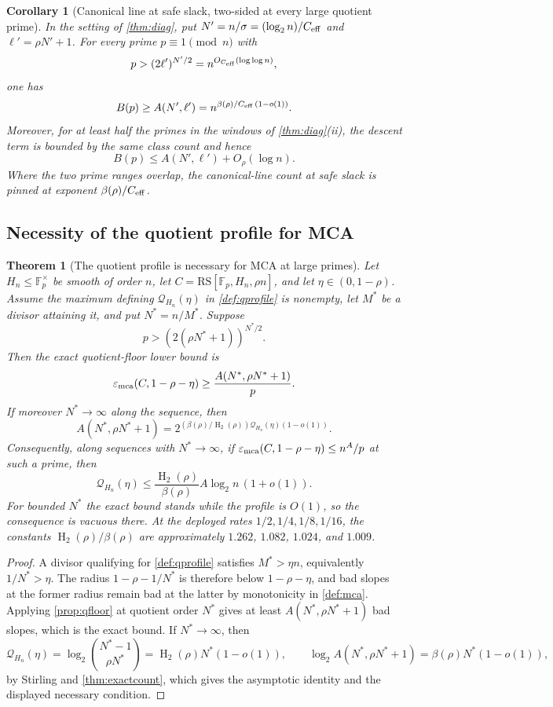 \documentclass[11pt]{article}
\newtheorem{theorem}{Theorem}[section]
\newtheorem{corollary}[corollary]{Corollary}
\theoremstyle{definition}
\newcommand{\F}{\mathbb F}
\newcommand{\eps}{\varepsilon}
\newcommand{\HH}{\operatorname{H}_2}
\newcommand{\RS}{\mathrm{RS}}
\newcommand{\emca}{\eps_{\rm mca}}
\newcommand{\ceff}{C_{\rm eff}}
\newcommand{\Acl}{A}
\begin{document}
\begin{corollary}[Canonical line at safe slack, two-sided at every large quotient prime]\label{cor:diagupgrade}
In the setting of \cref{thm:diag}, put $N'=n/\sigma=(\log_2n)/\ceff$ and $\ell'=\rho N'+1$.  For every prime $p\equiv1\pmod n$ with
\[
        p>(2\ell')^{N'/2}=n^{O_{\ceff}(\log\log n)},
\]
one has
\[
        B(p)\ge \Acl(N',\ell')=n^{\beta(\rho)/\ceff\,(1-o(1))}.
\]
Moreover, for at least half the primes in the windows of \cref{thm:diag}(ii), the descent term is bounded by the same class count and hence
\[
        B(p)\le \Acl(N',\ell')+O_\rho(\log n).
\]
Where the two prime ranges overlap, the canonical-line count at safe slack is pinned at exponent $\beta(\rho)/\ceff$.
\end{corollary}

\subsection{Necessity of the quotient profile for MCA}

\begin{theorem}[The quotient profile is necessary for MCA at large primes]\label{thm:qnecessity}
Let $H_n\le\F_p^\times$ be smooth of order $n$, let $C=\RS[\F_p,H_n,\rho n]$, and let $\eta\in(0,1-\rho)$.  Assume the maximum defining $\mathcal Q_{H_n}(\eta)$ in \cref{def:qprofile} is nonempty, let $M^*$ be a divisor attaining it, and put $N^*=n/M^*$.  Suppose
\[
        p>(2(\rho N^*+1))^{N^*/2}.
\]
Then the exact quotient-floor lower bound is
\[
        \emca(C,1-\rho-\eta)
        \ge
        \frac{\Acl(N^*,\rho N^*+1)}{p}.
\]
If moreover $N^*\to\infty$ along the sequence, then
\[
        \Acl(N^*,\rho N^*+1)
        =
        2^{(\beta(\rho)/\HH(\rho))\mathcal Q_{H_n}(\eta)(1-o(1))}.
\]
Consequently, along sequences with $N^*\to\infty$, if $\emca(C,1-\rho-\eta)\le n^A/p$ at such a prime, then
\[
        \mathcal Q_{H_n}(\eta)
        \le
        \frac{\HH(\rho)}{\beta(\rho)}A\log_2n\,(1+o(1)).
\]
For bounded $N^*$ the exact bound stands while the profile is $O(1)$, so the consequence is vacuous there.  At the deployed rates $1/2,1/4,1/8,1/16$, the constants $\HH(\rho)/\beta(\rho)$ are approximately $1.262$, $1.082$, $1.024$, and $1.009$.
\end{theorem}

\begin{proof}
A divisor qualifying for \cref{def:qprofile} satisfies $M^*>\eta n$, equivalently $1/N^*>
\eta$.  The radius $1-\rho-1/N^*$ is therefore below $1-\rho-\eta$, and bad slopes at the former radius remain bad at the latter by monotonicity in \cref{def:mca}.  Applying \cref{prop:qfloor} at quotient order $N^*$ gives at least $\Acl(N^*,\rho N^*+1)$ bad slopes, which is the exact bound.  If $N^*\to\infty$, then
\[
        \mathcal Q_{H_n}(\eta)
        =\log_2\binom{N^*-1}{\rho N^*}
        =\HH(\rho)N^*(1-o(1)),
        \qquad
        \log_2\Acl(N^*,\rho N^*+1)=\beta(\rho)N^*(1-o(1)),
\]
by Stirling and \cref{thm:exactcount}, which gives the asymptotic identity and the displayed necessary condition.
\end{proof}
\end{document}
